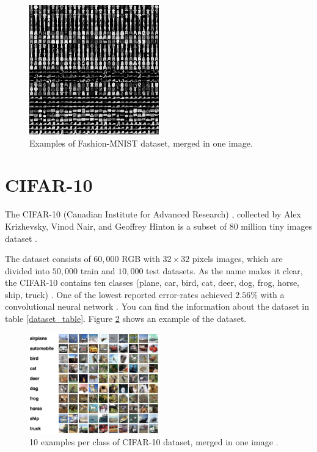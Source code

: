 \begin{figure}
  \centering
  \label{fig:fashion_mnist_dataset_example}
  \includegraphics[width=0.5\textwidth]{fig/fashion-mnist-dataset_example}
  \caption{Examples of Fashion-MNIST dataset, merged in one image.}
\end{figure}

\section{CIFAR-10}
The CIFAR-10 (Canadian Institute for Advanced Research)
, collected by Alex Krizhevsky, Vinod Nair, and Geoffrey Hinton is a subset of $80$ million tiny
images dataset \cite{CIFAR-10_origin_dataset}.

The dataset consists of $60,000$  RGB with $32 \times 32$ pixels images, which are divided into $50,000$ train and $10,000$ test datasets. As the name makes it clear, the CIFAR-10 contains ten classes (plane, car, bird, cat, deer, dog, frog, horse, ship, truck) \cite{CIFAR-10_dataset_reference}.
One of the lowest reported error-rates achieved $2.56\%$ with a convolutional neural network \cite{CIFAR-10_best_result_reference}. You can
find the information about the dataset in table
\ref{dataset_table}. Figure \ref{fig:cifar-10_dataset_example} shows an example of the dataset.

\begin{figure}
  \centering
  \label{fig:cifar-10_dataset_example}
  \includegraphics[width=0.5\textwidth]{fig/cifar-10}
  \caption{10 examples per class of CIFAR-10 dataset, merged in one image \cite{CIFAR-10_dataset_reference}.}
\end{figure}




